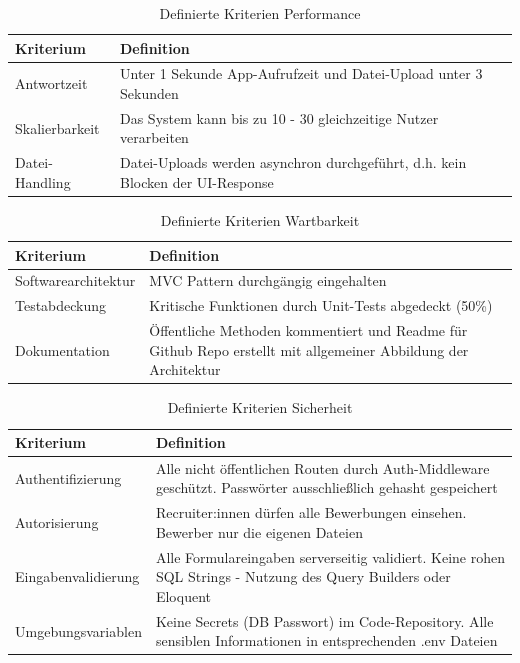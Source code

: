 \begin{table}[htbp]
\centering
\small
\begin{tabularx}{\textwidth}{lX}
\toprule
Kriterium & Definition \\
\midrule
Antwortzeit
& Unter 1 Sekunde App-Aufrufzeit und Datei-Upload unter 3 Sekunden \\

Skalierbarkeit
& Das System kann bis zu 10 - 30 gleichzeitige Nutzer verarbeiten \\

Datei-Handling
& Datei-Uploads werden asynchron durchgeführt, d.h. kein Blocken der UI-Response \\
\bottomrule
\end{tabularx}
\caption{Definierte Kriterien Performance}
\label{tab:performance}
\end{table}

\begin{table}[htbp]
\centering
\small
\begin{tabularx}{\textwidth}{lX}
\toprule
Kriterium & Definition \\
\midrule
Softwarearchitektur
& MVC Pattern durchgängig eingehalten \\

Testabdeckung
& Kritische Funktionen durch Unit-Tests abgedeckt (50\%) \\

Dokumentation
& Öffentliche Methoden kommentiert und Readme für Github Repo erstellt mit allgemeiner Abbildung der Architektur \\
\bottomrule
\end{tabularx}
\caption{Definierte Kriterien Wartbarkeit}
\label{tab:wartbarkeit}
\end{table}

\begin{table}[htbp]
\centering
\small
\begin{tabularx}{\textwidth}{lX}
\toprule
Kriterium & Definition \\
\midrule
Authentifizierung
& Alle nicht öffentlichen Routen durch Auth-Middleware geschützt. Passwörter ausschließlich gehasht gespeichert \\

Autorisierung
& Recruiter:innen dürfen alle Bewerbungen einsehen. Bewerber nur die eigenen Dateien \\

Eingabenvalidierung 
& Alle Formulareingaben serverseitig validiert. Keine rohen SQL Strings - Nutzung des Query Builders oder Eloquent \\

Umgebungsvariablen
& Keine Secrets (DB Passwort) im Code-Repository. Alle sensiblen Informationen in entsprechenden .env Dateien \\
\bottomrule
\end{tabularx}
\caption{Definierte Kriterien Sicherheit}
\label{tab:sicherheit}
\end{table}
